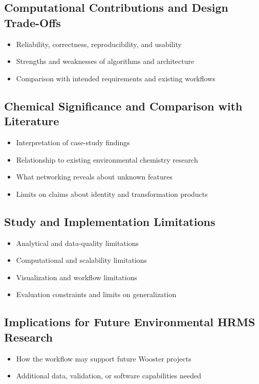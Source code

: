 \documentclass[11pt]{article}
\begin{document}
\begin{doublespace}
    \subsection{Computational Contributions and Design Trade-Offs}
        \begin{itemize}
            \item Reliability, correctness, reproducibility, and usability
            \item Strengths and weaknesses of algorithms and architecture
            \item Comparison with intended requirements and existing workflows
        \end{itemize}
    
    \subsection{Chemical Significance and Comparison with Literature}
        \begin{itemize}
            \item Interpretation of case-study findings
            \item Relationship to existing environmental chemistry research
            \item What networking reveals about unknown features
            \item Limits on claims about identity and transformation products
        \end{itemize}
    
    \subsection{Study and Implementation Limitations}
        \begin{itemize}
            \item Analytical and data-quality limitations
            \item Computational and scalability limitations
            \item Visualization and workflow limitations
            \item Evaluation constraints and limits on generalization
        \end{itemize}
    
    \subsection{Implications for Future Environmental HRMS Research}
        \begin{itemize}
            \item How the workflow may support future Wooster projects
            \item Additional data, validation, or software capabilities needed
        \end{itemize}    
    

\end{doublespace}
\end{document}
